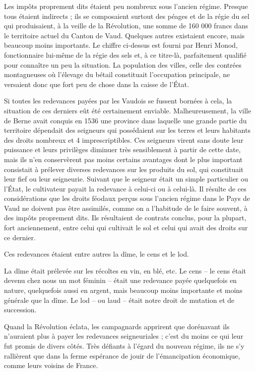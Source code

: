 \documentclass[french,twoside]{book} %
\newcommand\chaptercont{} %
\begin{document}
\chaptercont
\noindent Les impôts proprement dits étaient peu nombreux sous l’ancien régime. Presque tous étaient indirects ; ils se composaient surtout des péages et de la régie du sel qui produisaient, à la veille de la Révolution, une somme de 160 000 francs dans le territoire actuel du Canton de Vaud. Quelques autres existaient encore, mais beaucoup moins importants. Le chiffre ci-dessus est fourni par Henri Monod, fonctionnaire lui-même de la régie des sels et, à ce titre-là, parfaitement qualifié pour connaître un peu la situation. La population des villes, celle des contrées montagneuses où l’élevage du bétail constituait l’occupation principale, ne versaient donc que fort peu de chose dans la caisse de l’État.\par
Si toutes les redevances payées par les Vaudois se fussent bornées à cela, la situation de ces derniers eût été certainement enviable. Malheureusement, la ville de Berne avait conquis en 1536 une province dans laquelle une grande partie du territoire dépendait des seigneurs qui possédaient sur les terres et leurs habitants des droits nombreux et 4 imprescriptibles. Ces seigneurs virent sans doute leur puissance et leurs privilèges diminuer très sensiblement à partir de cette date, mais ils n’en conservèrent pas moins certains avantages dont le plus important consistait à prélever diverses redevances sur les produits du sol, qui constituait leur fief ou leur seigneurie. Suivant que le seigneur était un simple particulier ou l’État, le cultivateur payait la redevance à celui-ci ou à celui-là. Il résulte de ces considérations que les droits féodaux perçus sous l’ancien régime dans le Pays de Vaud ne doivent pas être assimilés, comme on a l’habitude de le faire souvent, à des impôts proprement dits. Ils résultaient de contrats conclus, pour la plupart, fort anciennement, entre celui qui cultivait le sol et celui qui avait des droits sur ce dernier.\par
Ces redevances étaient entre autres la dîme, le cens et le lod.\par
La dîme était prélevée sur les récoltes en vin, en blé, etc. Le cens – le cens était devenu chez nous un mot féminin – était une redevance payée quelquefois en nature, quelquefois aussi en argent, mais beaucoup moins importante et moins générale que la dîme. Le lod – ou laud – était notre droit de mutation et de succession.\par
Quand la Révolution éclata, les campagnards apprirent que dorénavant ils n’auraient plus à payer les redevances seigneuriales ; c’est du moins ce qui leur fut promis de divers côtés. Très défiants à l’égard du nouveau régime, ils ne s’y rallièrent que dans la ferme espérance de jouir de l’émancipation économique, comme leurs voisins de France.\par
\end{document}
